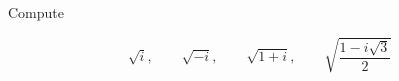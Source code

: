 Compute

$$\sqrt{i}, \qquad \sqrt{-i}, \qquad \sqrt{1+i}, \qquad \sqrt{\frac{1-i\sqrt3}{2}}$$

\begin{solution}\renewcommand{\qedsymbol}{}\ \\

    

\end{solution}